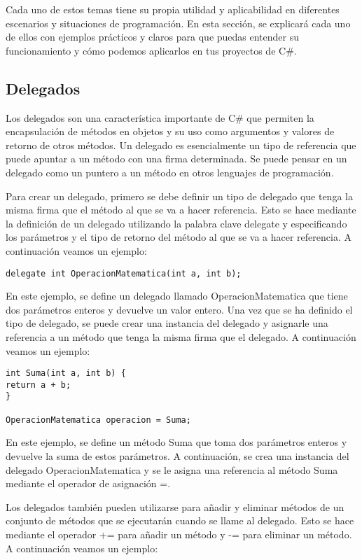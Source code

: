 \documentclass[executivepaper]{article}
\begin{document}
Cada uno de estos temas tiene su propia utilidad y aplicabilidad en diferentes escenarios y situaciones de programación. En esta sección, se explicará cada uno de ellos con ejemplos prácticos y claros para que puedas entender su funcionamiento y cómo podemos aplicarlos en tus proyectos de C\#.

\subsection{Delegados}

Los delegados son una característica importante de C\# que permiten la encapsulación de métodos en objetos y su uso como argumentos y valores de retorno de otros métodos. Un delegado es esencialmente un tipo de referencia que puede apuntar a un método con una firma determinada. Se puede pensar en un delegado como un puntero a un método en otros lenguajes de programación.

Para crear un delegado, primero se debe definir un tipo de delegado que tenga la misma firma que el método al que se va a hacer referencia. Esto se hace mediante la definición de un delegado utilizando la palabra clave delegate y especificando los parámetros y el tipo de retorno del método al que se va a hacer referencia. A continuación veamos un ejemplo:

\begin{lstlisting}
delegate int OperacionMatematica(int a, int b);
\end{lstlisting}

En este ejemplo, se define un delegado llamado OperacionMatematica que tiene dos parámetros enteros y devuelve un valor entero. Una vez que se ha definido el tipo de delegado, se puede crear una instancia del delegado y asignarle una referencia a un método que tenga la misma firma que el delegado. A continuación veamos un ejemplo:

\begin{lstlisting}
int Suma(int a, int b) {
return a + b;
}

OperacionMatematica operacion = Suma;
\end{lstlisting}

En este ejemplo, se define un método Suma que toma dos parámetros enteros y devuelve la suma de estos parámetros. A continuación, se crea una instancia del delegado OperacionMatematica y se le asigna una referencia al método Suma mediante el operador de asignación =.

Los delegados también pueden utilizarse para añadir y eliminar métodos de un conjunto de métodos que se ejecutarán cuando se llame al delegado. Esto se hace mediante el operador += para añadir un método y -= para eliminar un método. A continuación veamos un ejemplo:
\end{document}
